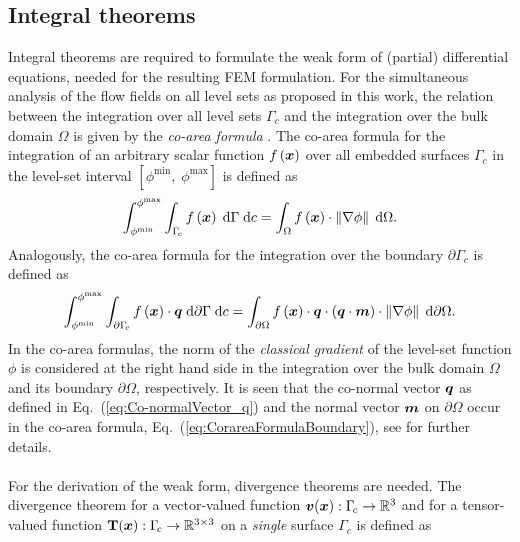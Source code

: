\documentclass[12pt, twoside, english]{article}
\numberwithin{equation}{section}
\newcommand{\vek}[1]{\mathchoice{\displaystyle\boldsymbol#1}
{\textstyle\boldsymbol#1}{\scriptstyle\boldsymbol#1}
{\scriptscriptstyle\boldsymbol#1}}
\newcommand{\mat}[1]{\mathchoice{\displaystyle\mathbf#1}
{\textstyle\mathbf#1}{\scriptstyle\mathbf#1}
{\scriptscriptstyle\mathbf#1}}
\begin{document}
\subsection{Integral theorems}\label{sec: IntThBTF}
Integral theorems are required to formulate the weak form of (partial) differential equations, needed for the resulting FEM formulation. For the simultaneous analysis of the flow fields on all level sets as proposed in this work, the relation between the integration over all level sets $\Gamma_{\!c}$ and the integration over the bulk domain $\Omega$ is given by the \emph{co-area formula} \cite{Dziuk_2008a,Federer_1969a,Morgan_1988a,Burger_2009a,Delfour_1995a}. The co-area formula for the integration of an arbitrary scalar function $f\left(\vek{x}\right)$ over all embedded surfaces $\Gamma_{\!c}$ in the level-set interval $\left[\phi^{\min},\;\phi^{\max}\right]$ is defined as
\begin{equation}
	\int_{\phi^{\min}}^{\phi^{\max}}\int_{\Gamma_{\!c}}f\left(\vek{x}\right)\;\ensuremath{\mathrm{d\ensuremath{\Gamma}}}\;\ensuremath{\mathrm{d}c}=\int_{\Omega}f\left(\vek{x}\right)\cdot\left\Vert \nabla\phi\right\Vert\;\ensuremath{\mathrm{d\ensuremath{\Omega}}}.\label{eq:CoareaFormulaDomain}
\end{equation}
Analogously, the co-area formula for the integration over the boundary $\partial\Gamma_{\!c}$  is defined as
\begin{equation}
		\int_{\phi^{\min}}^{\phi^{\max}}\int_{\partial\Gamma_{\!c}}f\left(\vek{x}\right)\cdot\vek{q}\;\ensuremath{\mathrm{d\ensuremath{\partial\Gamma}}}\;\ensuremath{\mathrm{d}c}=\int_{\partial\Omega}f\left(\vek{x}\right)\cdot\vek{q}\cdot\left(\vek{q}\cdot\vek{m}\right)\cdot\left\Vert \nabla\phi\right\Vert \;\ensuremath{\mathrm{d\ensuremath{\partial\Omega}}}.\label{eq:CorareaFormulaBoundary}
\end{equation}
In the co-area formulas, the norm of the \emph{classical gradient} of the level-set function $\phi$ is considered at the right hand side in the integration over the bulk domain $\Omega$ and its boundary $\partial\Omega$, respectively. It is seen that the co-normal vector $\vek{q}$ as defined in Eq.~(\ref{eq:Co-normalVector_q}) and the normal vector $\vek{m}$ on $\partial \Omega$ occur in the co-area formula, Eq.~(\ref{eq:CorareaFormulaBoundary}), see \cite{Fries_2023a,Dziuk_2013a} for further details.\\
\\
For the derivation of the weak form, divergence theorems are needed. The divergence theorem for a vector-valued function $\vek{v}(\vek{x}) : \Gamma_{\!c} \to \mathbb{R}^3$ and for a tensor-valued function $\mat{T}\!\left(\vek{x}\right)  : \Gamma_{\!c} \to\mathbb{R}^{3 \times 3}$ on a \emph{single} surface $\Gamma_{\!c}$ is defined as \cite{Delfour_1996a,Delfour_2011a,Fries_2018a}
\end{document}
